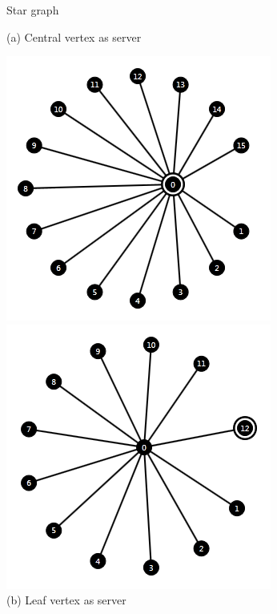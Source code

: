 \documentclass[a4paper,TexShade]{class}
\begin{document}
\begin{figure}[h]
\centering
\caption{Star graph} \label{fig:star}
   \begin{minipage}{0.49\textwidth}
     \caption*{(a) Central vertex as server}
     \includegraphics[width=\linewidth ,natwidth=330,natheight=330]{images/star-centre.png}     
   \end{minipage}
   \begin {minipage}{0.49\textwidth}
     \caption*{(b) Leaf vertex as server}
     \includegraphics[width=\linewidth ,natwidth=330,natheight=330]{images/star-leaf.png}
   \end{minipage}
\end{figure}
\end{document}
